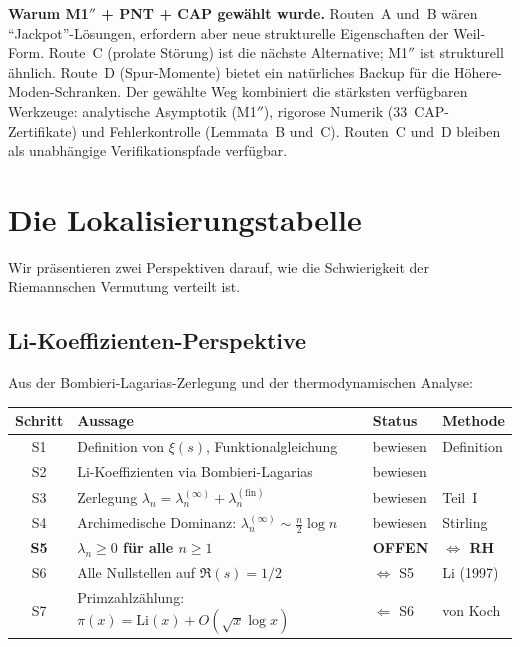 \documentclass[12pt,a4paper]{article}
\theoremstyle{definition}
\theoremstyle{remark}
\begin{document}
\noindent\textbf{Warum M1$''$ + PNT + CAP gewählt wurde.} Routen~A und~B wären ``Jackpot''-Lösungen, erfordern aber neue strukturelle Eigenschaften der Weil-Form. Route~C (prolate Störung) ist die nächste Alternative; M1$''$ ist strukturell ähnlich. Route~D (Spur-Momente) bietet ein natürliches Backup für die Höhere-Moden-Schranken. Der gewählte Weg kombiniert die stärksten verfügbaren Werkzeuge: analytische Asymptotik (M1$''$), rigorose Numerik (33~CAP-Zertifikate) und Fehlerkontrolle (Lemmata~B und~C). Routen~C und~D bleiben als unabhängige Verifikationspfade verfügbar.


\section{Die Lokalisierungstabelle}
\label{sec:localization}

Wir präsentieren zwei Perspektiven darauf, wie die Schwierigkeit der Riemannschen Vermutung verteilt ist.

\subsection{Li-Koeffizienten-Perspektive}

Aus der Bombieri-Lagarias-Zerlegung und der thermodynamischen Analyse:

\begin{center}
\renewcommand{\arraystretch}{1.2}
\begin{tabular}{c|l|l|l}
\textbf{Schritt} & \textbf{Aussage} & \textbf{Status} & \textbf{Methode} \\\hline
S1 & Definition von $\xi(s)$, Funktionalgleichung & bewiesen & Definition \\
S2 & Li-Koeffizienten via Bombieri-Lagarias & bewiesen & \cite{BombieriLagarias1999} \\
S3 & Zerlegung $\lambda_n = \lambda_n^{(\infty)} + \lambda_n^{(\mathrm{fin})}$ & bewiesen & Teil~I \\
S4 & Archimedische Dominanz: $\lambda_n^{(\infty)} \sim \frac{n}{2}\log n$ & bewiesen & Stirling \\
\textbf{S5} & \textbf{$\lambda_n \geq 0$ für alle $n \geq 1$} & \textbf{OFFEN} & \textbf{$\Longleftrightarrow$ RH} \\
S6 & Alle Nullstellen auf $\Re(s) = 1/2$ & $\Leftrightarrow$ S5 & Li (1997) \\
S7 & Primzahlzählung: $\pi(x) = \mathrm{Li}(x) + O(\sqrt{x}\log x)$ & $\Leftarrow$ S6 & von Koch
\end{tabular}
\end{center}
\end{document}
